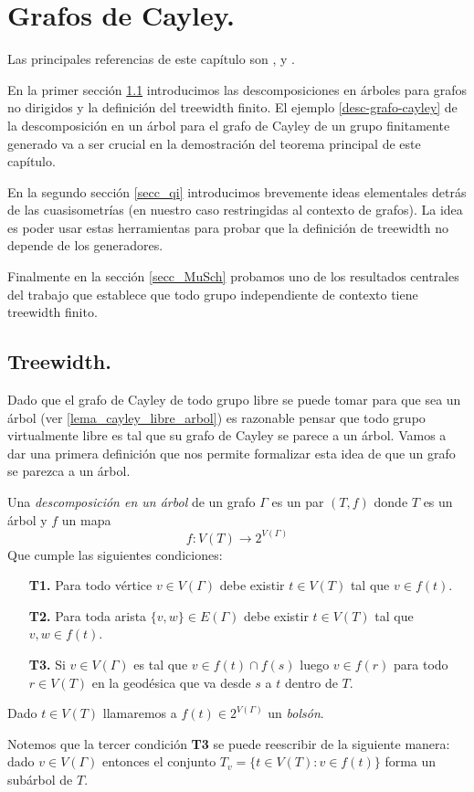 \documentclass[tesis.tex]{subfiles}
\begin{document}
	
\chapter{Grafos de Cayley.} \label{seccion_treewidth}

Las principales referencias de este capítulo son \cite{diekert2017context}, \cite{kuske2005logical} y \cite{diestel2005graph}.

En la primer sección \ref{secc_tw} introducimos las descomposiciones en árboles para grafos no dirigidos y la definición del treewidth finito.
El ejemplo \ref{desc-grafo-cayley} de la descomposición en un árbol para el grafo de Cayley de un grupo finitamente generado va a ser crucial en la demostración del teorema principal de este capítulo.


En la segundo sección \ref{secc_qi} introducimos brevemente ideas elementales detrás de las cuasisometrías (en nuestro caso restringidas al contexto de grafos).
La idea es poder usar estas herramientas para probar que la definición de treewidth no depende de los generadores.

Finalmente en la sección \ref{secc_MuSch} probamos uno de los resultados centrales del trabajo que establece que todo grupo independiente de contexto tiene treewidth finito.



\section{Treewidth.}\label{secc_tw}

Dado que el grafo de Cayley de todo grupo libre se puede tomar para que sea un árbol (ver \ref{lema_cayley_libre_arbol}) es razonable pensar que todo grupo virtualmente libre es tal que su grafo de Cayley se parece a un árbol. 
Vamos a dar una primera definición que nos permite formalizar esta idea de que un grafo se parezca a un árbol.


\begin{deff}\label{desc-arbol}
	Una \emph{descomposición en un árbol} de un grafo $\Gamma$ es un par $(T,f)$ donde
	$T$ es un árbol y $f$ un mapa 
	\[
	f: V(T) \to 2^{V(\Gamma)}
	\]
	Que cumple las siguientes condiciones:
	\begin{enumerate}
		\item[\textbf{T1.}] Para todo vértice $v \in V(\Gamma)$ debe existir $t \in V(T)$ tal que $v \in f(t)$. 
		\item[\textbf{T2.}] Para toda arista $\{v,w\} \in E(\Gamma)$ 
		debe existir $t \in V(T)$ tal que $v,w \in f(t)$.
		\item[\textbf{T3.}] Si $v \in V(\Gamma)$ es tal que $v \in f(t) \cap f(s)$ luego $v \in f(r)$ para todo $r \in V(T)$ en la geodésica que va desde $s$ a $t$ dentro de $T$.  
	\end{enumerate}
	Dado $t \in V(T)$ llamaremos a $f(t) \in 2^{V(\Gamma)}$ un \emph{bolsón}.
	 
\end{deff}
Notemos que la tercer condición \textbf{T3} se puede reescribir de la siguiente manera:
dado $v \in V(\Gamma)$ entonces el conjunto $T_{v} = \{ t \in V(T) :  v \in f(t) \}$ forma un subárbol de $T$.
\smallskip
\end{document}
